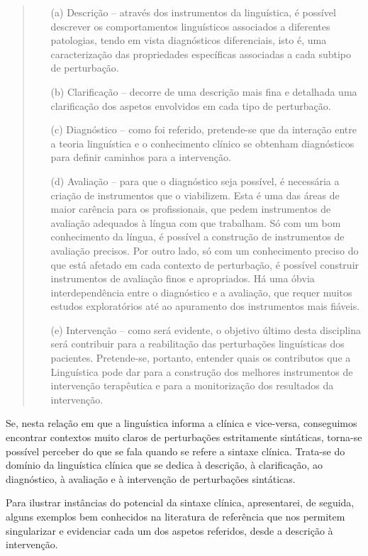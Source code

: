 \documentclass[output=paper,colorlinks,citecolor=brown,booklanguage=portuguese]{langscibook}
\begin{document}
\begin{quote}
\begin{enumerate}
    \item[(a)] Descrição -- através dos instrumentos da linguística, é possível descrever os comportamentos linguísticos associados a diferentes patologias, tendo em vista diagnósticos diferenciais, isto é, uma caracterização das propriedades específicas associadas a cada subtipo de perturbação.
    \item[(b)] 	Clarificação -- decorre de uma descrição mais fina e detalhada uma clarificação dos aspetos envolvidos em cada tipo de perturbação.
    \item[(c)] 	Diagnóstico -- como foi referido, pretende-se que da interação entre a teoria linguística e o conhecimento clínico se obtenham diagnósticos para definir caminhos para a intervenção.
    \item[(d)] 	Avaliação -- para que o diagnóstico seja possível, é necessária a criação de instrumentos que o viabilizem. Esta é uma das áreas de maior carência para os profissionais, que pedem instrumentos de avaliação adequados à língua com que trabalham. Só com um bom conhecimento da língua, é possível a construção de instrumentos de avaliação precisos. Por outro lado, só com um conhecimento preciso do que está afetado em cada contexto de perturbação, é possível construir instrumentos de avaliação finos e apropriados. Há uma óbvia interdependência entre o diagnóstico e a avaliação, que requer muitos estudos exploratórios até ao apuramento dos instrumentos mais fiáveis.
    \item[(e)] 	Intervenção -- como será evidente, o objetivo último desta disciplina será contribuir para a reabilitação das perturbações linguísticas dos pacientes. Pretende-se, portanto, entender quais os contributos que a Linguística pode dar para a construção dos melhores instrumentos de intervenção terapêutica e para a monitorização dos resultados da intervenção.
\end{enumerate}
\end{quote}

Se, nesta relação em que a linguística informa a clínica e vice-versa, conseguimos encontrar contextos muito claros de perturbações estritamente sintáticas, torna-se possível perceber do que se fala quando se refere a sintaxe clínica. Tra\-ta-se do domínio da linguística clínica que se dedica à descrição, à clarificação, ao diagnóstico, à avaliação e à intervenção de perturbações sintáticas.

Para ilustrar instâncias do potencial da sintaxe clínica, apresentarei, de seguida, alguns exemplos bem conhecidos na literatura de referência que nos permitem singularizar e evidenciar cada um dos aspetos referidos, desde a descrição à intervenção.
\end{document}

